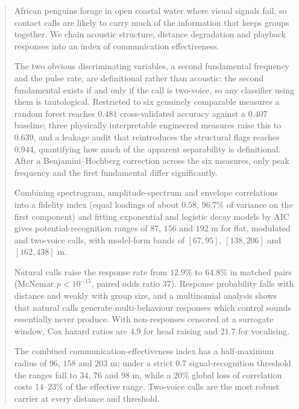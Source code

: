 \documentclass{apmcmthesis}
\begin{document}
\pagestyle{frontmatterstyle}

\begin{abstract}
African penguins forage in open coastal water where visual signals fail, so contact
calls are likely to carry much of the information that keeps groups together. We chain
acoustic structure, distance degradation and playback responses into an index of
communication effectiveness.

The two obvious discriminating variables, a second fundamental frequency and the pulse
rate, are definitional rather than acoustic: the second fundamental exists if and only if
the call is two-voice, so any classifier using them is
tautological. Restricted to six genuinely comparable measures a random forest reaches
$0.481$ cross-validated accuracy against a $0.407$ baseline; three physically
interpretable engineered measures raise this to $0.639$, and a leakage audit that
reintroduces the structural flags reaches $0.944$, quantifying how much of the apparent
separability is definitional. After a Benjamini--Hochberg correction across the six
measures, only peak frequency and the first fundamental differ significantly.

Combining spectrogram, amplitude-spectrum and envelope correlations into a fidelity index
(equal loadings of about $0.58$, $96.7\%$ of variance on the first component) and fitting
exponential and logistic decay models by AIC gives potential-recognition ranges of $87$,
$156$ and $192$ m for flat, modulated and two-voice calls, with model-form bands of
$[67,95]$, $[138,206]$ and $[162,438]$ m.

Natural calls raise the response rate from $12.9\%$ to $64.8\%$ in matched pairs
(McNemar $p<10^{-15}$, paired odds ratio $37$).
Response probability falls with distance and weakly with group size, and a multinomial
analysis shows that natural calls generate multi-behaviour responses which control sounds
essentially never produce. With non-responses censored at a surrogate window, Cox hazard
ratios are $4.9$ for head raising and $21.7$ for vocalising.

The combined communication-effectiveness index has a half-maximum radius of $96$, $158$
and $203$ m; under a strict $0.7$ signal-recognition threshold the ranges fall to $34$,
$76$ and $98$ m, while a $20\%$ global loss of correlation costs $14$--$23\%$ of
the effective range. Two-voice calls are the most robust carrier at every distance and
threshold.

\end{abstract}
\end{document}
